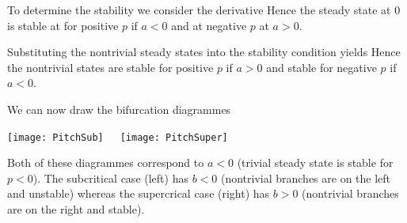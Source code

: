 To determine the stability we consider the derivative 
Hence the steady state at 0 is stable at for positive $p$ if $a<0$ and at negative $p$ at $a>0$.

Substituting the nontrivial steady states into the stability condition yields
Hence the nontrivial states are stable for positive $p$ if $a>0$ and stable for negative $p$ if $a<0$.

We can now draw the bifurcation diagrammes 
\begin{center}
\texttt{[image: PitchSub]}~~~\texttt{[image: PitchSuper]}
\end{center}
Both of these diagrammes correspond to $a<0$ (trivial steady state is stable for $p<0$). The subcritical case (left) has $b<0$ (nontrivial branches are on the left and unstable) whereas the supercrical case (right) has $b>0$ (nontrivial branches are on the right and stable). 
